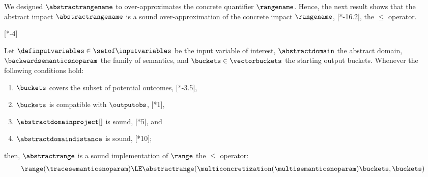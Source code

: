 We designed $\abstractrangename$ to over-approximates the concrete quantifier $\rangename$.
Hence, the next result shows that the abstract impact $\abstractrangename$ is a sound over-approximation of the concrete impact $\rangename$, \cf{} [*-16.2], \wrt{} the $\le$ operator.

[*-4]
\begin{lemma}
  Let $\definputvariables\in\setof\inputvariables$ be the input variable of interest, $\abstractdomain$ the abstract domain, $\backwardsemanticsnoparam$ the family of semantics, and $\buckets\in\vectorbuckets$ the starting output buckets.
  Whenever the following conditions hold:
  \begin{enumerate}[label=(\roman*)]
    \item \label{proof:ab} $\buckets$ covers the subset of potential outcomes, \cf{} [*-3.5],
    \item \label{proof:ac} $\buckets$ is compatible with $\outputobs$, \cf{} [*1],
    \item \label{proof:ad} $\abstractdomainproject[]$ is sound, \cf{} [*5], and
    \item \label{proof:ae} $\abstractdomaindistance$ is sound, \cf{} [*10];
  \end{enumerate}
  then, $\abstractrange$ is a sound implementation of $\range$ \wrt{} the $\le$ operator:
  \begin{align*}
    \range(\tracesemanticsnoparam) \LE \abstractrange(\multiconcretization(\multisemanticsnoparam)\buckets, \buckets)
  \end{align*}
\end{lemma}
